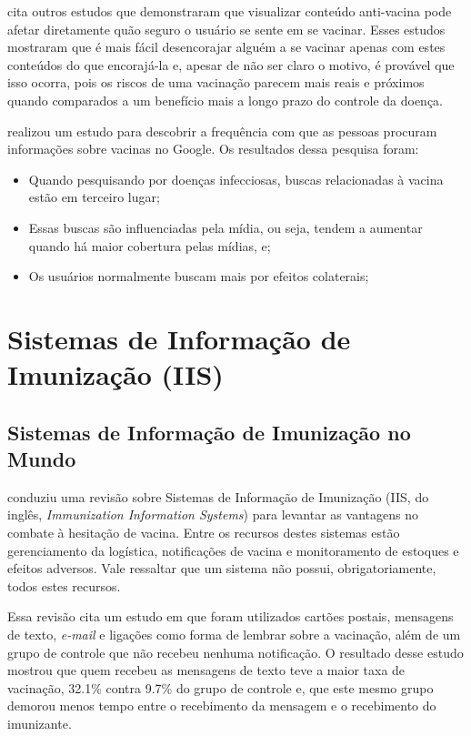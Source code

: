     \cite{puri_social_2020} cita outros estudos que demonstraram que visualizar conteúdo anti-vacina pode afetar diretamente quão seguro o usuário se sente em se vacinar. Esses estudos mostraram que é mais fácil desencorajar alguém a se vacinar apenas com estes conteúdos do que encorajá-la e, apesar de não ser claro o motivo, é provável que isso ocorra, pois os riscos de uma vacinação parecem mais reais e próximos quando comparados a um benefício mais a longo prazo do controle da doença.
    
    \cite{bragazzi_how_2017} realizou um estudo para descobrir a frequência com que as pessoas procuram informações sobre vacinas no Google. Os resultados dessa pesquisa foram:

    \begin{itemize}
        \item Quando pesquisando por doenças infecciosas, buscas relacionadas à vacina estão em terceiro lugar;
        \item Essas buscas são influenciadas pela mídia, ou seja, tendem a aumentar quando há maior cobertura pelas mídias, e;
        \item Os usuários normalmente buscam mais por efeitos colaterais;
    \end{itemize}


\section{Sistemas de Informação de Imunização (IIS)}
    \subsection{Sistemas de Informação de Imunização no Mundo}
    \cite{gianfredi_countering_2019} conduziu uma revisão sobre Sistemas de Informação de Imunização (IIS, do inglês, \textit{Immunization Information Systems}) para levantar as vantagens no combate à hesitação de vacina. Entre os recursos destes sistemas estão gerenciamento da logística, notificações de vacina e monitoramento de estoques e efeitos adversos. Vale ressaltar que um sistema não possui, obrigatoriamente, todos estes recursos.

    Essa revisão cita um estudo em que foram utilizados cartões postais, mensagens de texto, \textit{e-mail} e ligações como forma de lembrar sobre a vacinação, além de um grupo de controle que não recebeu nenhuma notificação. O resultado desse estudo mostrou que quem recebeu as mensagens de texto teve a maior taxa de vacinação, 32.1\% contra 9.7\% do grupo de controle e, que este mesmo grupo demorou menos tempo entre o recebimento da mensagem e o recebimento do imunizante.
    
